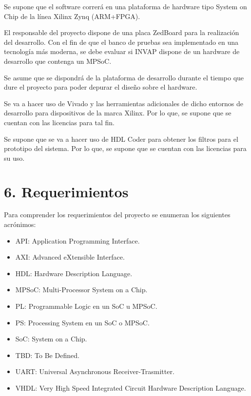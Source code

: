 \documentclass[
11pt, %
]{charter}
\begin{document}
Se supone que el software correrá en una plataforma de hardware tipo System on Chip de la línea Xilinx Zynq (ARM+FPGA).

El responsable del proyecto dispone de una placa ZedBoard para la realización del desarrollo. Con el fin de que el banco de pruebas sea implementado en una tecnología más moderna, se debe evaluar si INVAP dispone de un hardware de desarrollo que contenga un MPSoC.

Se asume que se dispondrá de la plataforma de desarrollo durante el tiempo que dure el proyecto para poder depurar el diseño sobre el hardware.

Se va a hacer uso de Vivado y las herramientas adicionales de dicho entornos de desarrollo para dispositivos de la marca Xilinx. Por lo que, se supone que se cuentan con las licencias para tal fin.

Se supone que se va a hacer uso de HDL Coder para obtener los filtros para el prototipo del sistema. Por lo que, se supone que se cuentan con las licencias para su uso.

\section{6. Requerimientos}
\label{sec:requerimientos}

Para comprender los requerimientos del proyecto se enumeran los siguientes acrónimos:

\begin{itemize}
		\item API: Application Programming Interface.
		\item AXI: Advanced eXtensible Interface.
		\item HDL: Hardware Description Language.
		\item MPSoC: Multi-Processor System on a Chip.
		\item PL: Programmable Logic en un SoC u MPSoC.
		\item PS: Processing System en un SoC o MPSoC.
		\item SoC: System on a Chip.
		\item TBD: To Be Defined.
		\item UART: Universal Asynchronous Receiver-Trasmitter.
		\item VHDL: Very High Speed Integrated Circuit Hardware Description Language.
\end{itemize}
\end{document}
